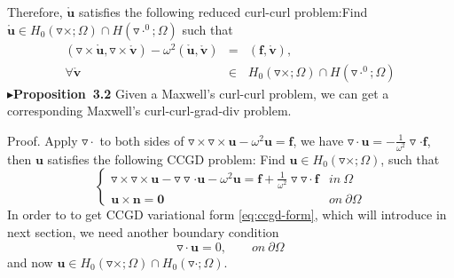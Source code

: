 \documentclass[a4paper,11pt]{article}
\begin{document}
Therefore, $\mathring{\mathbf{u}}$ satisfies the following reduced curl-curl problem:\newline \indent Find $\mathring{\mathbf{u}}\in H_0(\triangledown\times;\Omega)\cap H(\triangledown\cdot^0;\Omega)$ such that
\begin{eqnarray}\label{variform:cc_0}
(\triangledown\times\mathring{\mathbf{u}} , \triangledown\times\mathring{\mathbf{v}}) - \omega^{2}(\mathring{\mathbf{u}},\mathring{\mathbf{v}}) & = & (\mathbf{f} , \mathring{\mathbf{v}}), \\ \nonumber
 \forall\mathring{\mathbf{v}}&\in &H_0(\triangledown\times;\Omega) \cap  H(\triangledown\cdot^0;\Omega)
\end{eqnarray}
$\blacktriangleright$\textbf{Proposition\ 3.2} Given a Maxwell's curl-curl problem, we can get a corresponding Maxwell's curl-curl-grad-div problem.

Proof. Apply $\triangledown\cdot$ to both sides of $\triangledown\times\triangledown\times\mathbf{u} - \omega^2\mathbf{u} = \mathbf{f}$, we have $\triangledown\cdot\mathbf{u} = -\frac{1}{\omega^2}\triangledown\cdot\mathbf{f}$, then $\mathbf{u}$ satisfies the following CCGD problem:
 Find $\mathbf{u}\in H_0(\triangledown\times;\Omega)$, such that
\begin{equation}\label{eq:cc-ccgd}
\left\{\begin{array}{cc}
\triangledown\times\triangledown\times\mathbf{u} - \triangledown\triangledown\cdot\mathbf{u} - \omega^2\mathbf{u} = \mathbf{f} +  \frac{1}{\omega^2}\triangledown\triangledown\cdot\mathbf{f}&  in\ \Omega \\
\mathbf{u}\times\mathbf{n} = \mathbf{0}  & on\ \partial\Omega
\end{array}\right.
\end{equation}
In order to to get CCGD variational form \ref{eq:ccgd-form}, which will introduce in next  section, we need another boundary condition
\begin{equation}\label{eq:cc-ccgd-bc}
\triangledown\cdot\mathbf{u} = 0, \qquad on\ \partial\Omega
\end{equation}
and now $\mathbf{u}\in H_0(\triangledown\times;\Omega)\cap H_0(\triangledown\cdot;\Omega)$.
\end{document}
